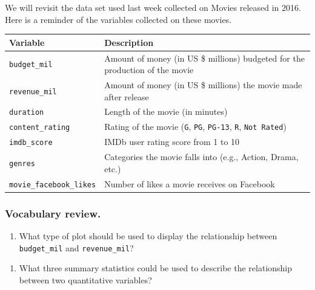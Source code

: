 \documentclass[
]{report}
\providecommand{\tightlist}{%
  \setlength{\itemsep}{0pt}\setlength{\parskip}{0pt}}
\begin{document}
We will revisit the data set used last week collected on Movies released in 2016. Here is a reminder of the variables collected on these movies.

\begin{longtable}[]{@{}
  >{\raggedright\arraybackslash}p{}
  >{\raggedright\arraybackslash}p{}@{}}
\toprule
\textbf{Variable} & \textbf{Description} \\
\midrule
\endhead
\texttt{budget\_mil} & Amount of money (in US \$ millions) budgeted for the production of the movie \\
\texttt{revenue\_mil} & Amount of money (in US \$ millions) the movie made after release \\
\texttt{duration} & Length of the movie (in minutes) \\
\texttt{content\_rating} & Rating of the movie (\texttt{G}, \texttt{PG}, \texttt{PG-13}, \texttt{R}, \texttt{Not\ Rated}) \\
\texttt{imdb\_score} & IMDb user rating score from 1 to 10 \\
\texttt{genres} & Categories the movie falls into (e.g., Action, Drama, etc.) \\
\texttt{movie\_facebook\_likes} & Number of likes a movie receives on Facebook \\
\bottomrule
\end{longtable}

\hypertarget{vocabulary-review.-1}{%
\subsubsection*{Vocabulary review.}\label{vocabulary-review.-1}}

\begin{enumerate}
\def\labelenumi{\arabic{enumi}.}
\tightlist
\item
  What type of plot should be used to display the relationship between \texttt{budget\_mil} and \texttt{revenue\_mil}?
\end{enumerate}

\vspace{0.2in}

\begin{enumerate}
\def\labelenumi{\arabic{enumi}.}
\setcounter{enumi}{1}
\tightlist
\item
  What three summary statistics could be used to describe the relationship between two quantitative variables?
\end{enumerate}
\end{document}
